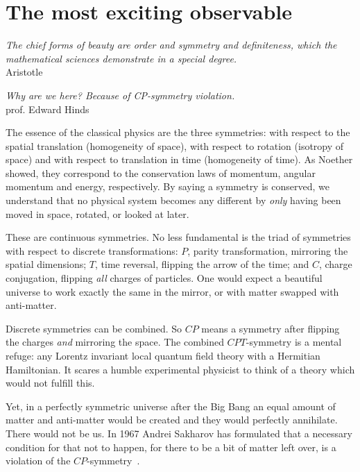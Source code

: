 \chapter{The most exciting observable}
\label{ch:nedm-at-psi}

\begin{center}
  \emph{The chief forms of beauty are order and symmetry and definiteness, which the mathematical sciences demonstrate in a special degree.}\\
  Aristotle
\end{center}


\begin{center}
  \emph{Why are we here? Because of CP-symmetry violation.}\\
  prof. Edward Hinds
\end{center}


The essence of the classical physics are the three symmetries: with respect to the spatial translation (homogeneity of space), with respect to rotation (isotropy of space) and with respect to translation in time (homogeneity of time). As Noether showed, they correspond to the conservation laws of momentum, angular momentum and energy, respectively. By saying a symmetry is conserved, we understand that no physical system becomes any different by \emph{only} having been moved in space, rotated, or looked at later.

These are continuous symmetries. No less fundamental is the triad of symmetries with respect to discrete transformations: $P$, parity transformation, mirroring the spatial dimensions; $T$, time reversal, flipping the arrow of the time; and $C$, charge conjugation, flipping \emph{all} charges of particles. One would expect a beautiful universe to work exactly the same in the mirror, or with matter swapped with anti-matter.

Discrete symmetries can be combined. So $CP$ means a symmetry after flipping the charges \emph{and} mirroring the space. The combined $CPT$-symmetry is a mental refuge: any Lorentz invariant local quantum field theory with a Hermitian Hamiltonian. It scares a humble experimental physicist to think of a theory which would not fulfill this.

Yet, in a perfectly symmetric universe after the Big Bang an equal amount of matter and anti-matter would be created and they would perfectly annihilate. There would not be us.
In 1967 Andrei Sakharov
has formulated that a necessary condition for that not to happen, for there to be a bit of matter left over, is a violation of the $CP$-symmetry~\cite{0038-5670-34-5-A08}.

